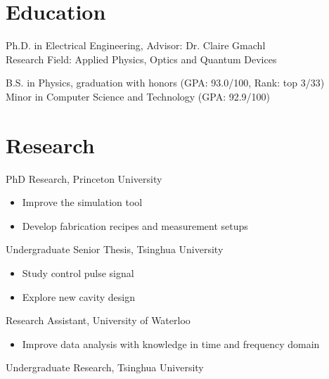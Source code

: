\documentclass[11pt,letterpaper]{resume}
\begin{document}
\section{Education}

Ph.D. in Electrical Engineering, Advisor: Dr. Claire Gmachl \\
Research Field: Applied Physics, Optics and Quantum Devices

B.S. in Physics, graduation with honors (GPA: 93.0/100, Rank: top 3/33)\\
Minor in Computer Science and Technology (GPA: 92.9/100)


\section{Research}
PhD Research, Princeton University
\begin{itemize}
    \item Improve the simulation tool
    \item Develop fabrication recipes and measurement setups
\end{itemize}\medskip

Undergraduate Senior Thesis, Tsinghua University
\begin{itemize}
    \item Study control pulse signal
    \item Explore new cavity design
\end{itemize}\medskip

Research Assistant, University of Waterloo
\begin{itemize}
    \item Improve data analysis with knowledge in time and frequency domain 
\end{itemize}\medskip

Undergraduate Research, Tsinghua University
\end{document}

